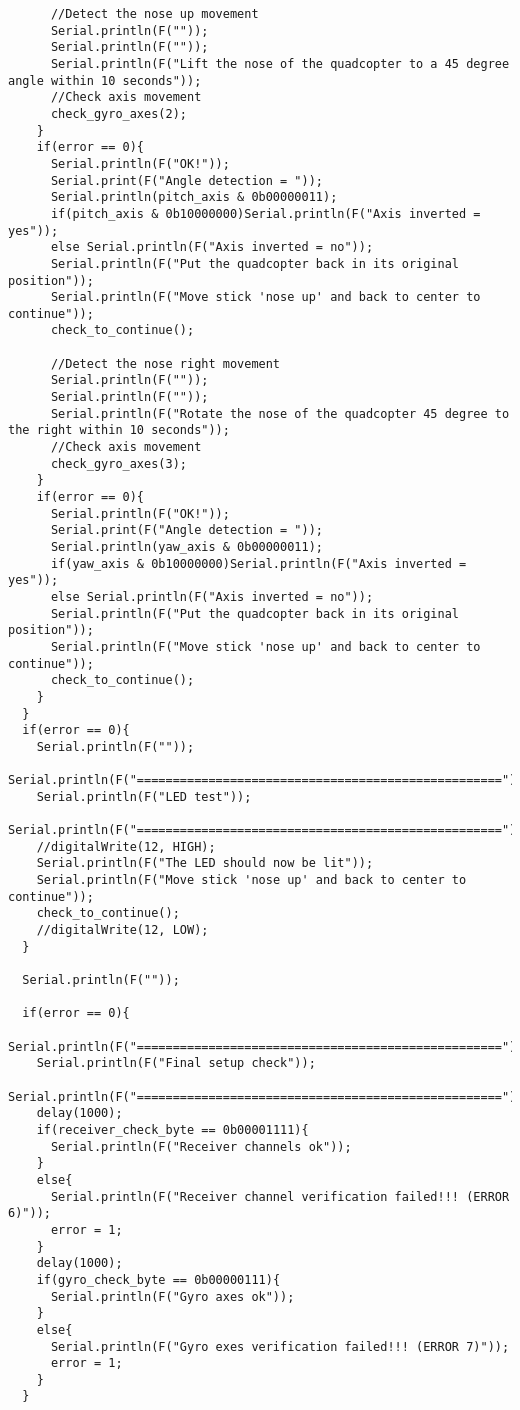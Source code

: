 \begin{lstlisting}
      //Detect the nose up movement
      Serial.println(F(""));
      Serial.println(F(""));
      Serial.println(F("Lift the nose of the quadcopter to a 45 degree angle within 10 seconds"));
      //Check axis movement
      check_gyro_axes(2);
    }
    if(error == 0){
      Serial.println(F("OK!"));
      Serial.print(F("Angle detection = "));
      Serial.println(pitch_axis & 0b00000011);
      if(pitch_axis & 0b10000000)Serial.println(F("Axis inverted = yes"));
      else Serial.println(F("Axis inverted = no"));
      Serial.println(F("Put the quadcopter back in its original position"));
      Serial.println(F("Move stick 'nose up' and back to center to continue"));
      check_to_continue();
      
      //Detect the nose right movement
      Serial.println(F(""));
      Serial.println(F(""));
      Serial.println(F("Rotate the nose of the quadcopter 45 degree to the right within 10 seconds"));
      //Check axis movement
      check_gyro_axes(3);
    }
    if(error == 0){
      Serial.println(F("OK!"));
      Serial.print(F("Angle detection = "));
      Serial.println(yaw_axis & 0b00000011);
      if(yaw_axis & 0b10000000)Serial.println(F("Axis inverted = yes"));
      else Serial.println(F("Axis inverted = no"));
      Serial.println(F("Put the quadcopter back in its original position"));
      Serial.println(F("Move stick 'nose up' and back to center to continue"));
      check_to_continue();
    }
  }
  if(error == 0){
    Serial.println(F(""));
    Serial.println(F("==================================================="));
    Serial.println(F("LED test"));
    Serial.println(F("==================================================="));
    //digitalWrite(12, HIGH);
    Serial.println(F("The LED should now be lit"));
    Serial.println(F("Move stick 'nose up' and back to center to continue"));
    check_to_continue();
    //digitalWrite(12, LOW);
  }
  
  Serial.println(F(""));
  
  if(error == 0){
    Serial.println(F("==================================================="));
    Serial.println(F("Final setup check"));
    Serial.println(F("==================================================="));
    delay(1000);
    if(receiver_check_byte == 0b00001111){
      Serial.println(F("Receiver channels ok"));
    }
    else{
      Serial.println(F("Receiver channel verification failed!!! (ERROR 6)"));
      error = 1;
    }
    delay(1000);
    if(gyro_check_byte == 0b00000111){
      Serial.println(F("Gyro axes ok"));
    }
    else{
      Serial.println(F("Gyro exes verification failed!!! (ERROR 7)"));
      error = 1;
    }
  }     
  

\end{lstlisting}
